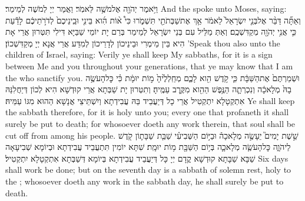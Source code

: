 {וַיֹּ֥אמֶר יְהֹוָ֖ה אֶל\maqqaf מֹשֶׁ֥ה לֵּאמֹֽר׃}
{וַאֲמַר יְיָ לְמֹשֶׁה לְמֵימַר׃}
{And the \lord\space spoke unto Moses, saying:}{}
{וְאַתָּ֞ה דַּבֵּ֨ר אֶל\maqqaf בְּנֵ֤י יִשְׂרָאֵל֙ לֵאמֹ֔ר אַ֥ךְ אֶת\maqqaf שַׁבְּתֹתַ֖י תִּשְׁמֹ֑רוּ כִּי֩ א֨וֹת הִ֜וא בֵּינִ֤י וּבֵֽינֵיכֶם֙ לְדֹרֹ֣תֵיכֶ֔ם לָדַ֕עַת כִּ֛י אֲנִ֥י יְהֹוָ֖ה מְקַדִּשְׁכֶֽם׃}
{וְאַתְּ מַלֵּיל עִם בְּנֵי יִשְׂרָאֵל לְמֵימַר בְּרַם יָת יוֹמֵי שַׁבַּיָּא דִּילִי תִּטְּרוּן אֲרֵי אָת הִיא בֵּין מֵימְרִי וּבֵינֵיכוֹן לְדָרֵיכוֹן לְמִדַּע אֲרֵי אֲנָא יְיָ מְקַדִּשְׁכוֹן׃}
{’Speak thou also unto the children of Israel, saying: Verily ye shall keep My sabbaths, for it is a sign between Me and you throughout your generations, that ye may know that I am the \lord\space who sanctify you.}{}
{וּשְׁמַרְתֶּם֙ אֶת\maqqaf הַשַּׁבָּ֔ת כִּ֛י קֹ֥דֶשׁ הִ֖וא לָכֶ֑ם מְחַֽלְלֶ֙יהָ֙ מ֣וֹת יוּמָ֔ת כִּ֗י כׇּל\maqqaf הָעֹשֶׂ֥ה בָהּ֙ מְלָאכָ֔ה וְנִכְרְתָ֛ה הַנֶּ֥פֶשׁ הַהִ֖וא מִקֶּ֥רֶב עַמֶּֽיהָ׃}
{וְתִטְּרוּן יָת שַׁבְּתָא אֲרֵי קוּדְשָׁא הִיא לְכוֹן דְּיַחֲלִנַּהּ אִתְקְטָלָא יִתְקְטִיל אֲרֵי כָל דְּיַעֲבֵיד בַּהּ עֲבִידְתָא וְיִשְׁתֵּיצֵי אֲנָשָׁא הַהוּא מִגּוֹ עַמֵּיהּ׃}
{Ye shall keep the sabbath therefore, for it is holy unto you; every one that profaneth it shall surely be put to death; for whosoever doeth any work therein, that soul shall be cut off from among his people.}{}
{שֵׁ֣שֶׁת יָמִים֮ יֵעָשֶׂ֣ה מְלָאכָה֒ וּבַיּ֣וֹם הַשְּׁבִיעִ֗י שַׁבַּ֧ת שַׁבָּת֛וֹן קֹ֖דֶשׁ לַיהֹוָ֑ה כׇּל\maqqaf הָעֹשֶׂ֧ה מְלָאכָ֛ה בְּי֥וֹם הַשַּׁבָּ֖ת מ֥וֹת יוּמָֽת׃}
{שִׁתָּא יוֹמִין תִּתְעֲבֵיד עֲבִידְתָא וּבְיוֹמָא שְׁבִיעָאָה שַׁבָּא שַׁבָּתָא קוּדְשָׁא קֳדָם יְיָ כָּל דְּיַעֲבֵיד עֲבִידְתָא בְּיוֹמָא דְּשַׁבְּתָא אִתְקְטָלָא יִתְקְטִיל׃}
{Six days shall work be done; but on the seventh day is a sabbath of solemn rest, holy to the \lord; whosoever doeth any work in the sabbath day, he shall surely be put to death.}{}
